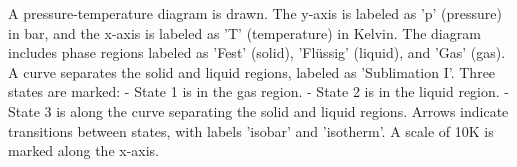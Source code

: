 A pressure-temperature diagram is drawn. The y-axis is labeled as 'p' (pressure) in bar, and the x-axis is labeled as 'T' (temperature) in Kelvin. The diagram includes phase regions labeled as 'Fest' (solid), 'Flüssig' (liquid), and 'Gas' (gas). A curve separates the solid and liquid regions, labeled as 'Sublimation I'. Three states are marked:  
- State 1 is in the gas region.  
- State 2 is in the liquid region.  
- State 3 is along the curve separating the solid and liquid regions.  
Arrows indicate transitions between states, with labels 'isobar' and 'isotherm'. A scale of 10K is marked along the x-axis.